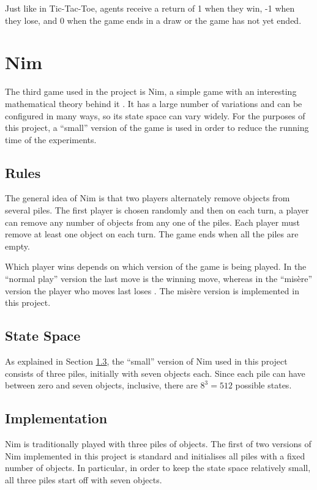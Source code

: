 \documentclass[11pt,a4paper]{report}
\begin{document}
Just like in Tic-Tac-Toe, agents receive a return of 1 when they win, -1 when they lose, and 0 when the game ends in a draw or the game has not yet ended.


\section{Nim}
\label{sec:Nim}

The third game used in the project is Nim, a simple game with an interesting mathematical theory behind it \cite{nim-rules}. It has a large number of variations and can be configured in many ways, so its state space can vary widely. For the purposes of this project, a ``small'' version of the game is used in order to reduce the running time of the experiments.


\subsection{Rules}

The general idea of Nim \cite{nim-rules} is that two players alternately remove objects from several piles. The first player is chosen randomly and then on each turn, a player can remove any number of objects from any one of the piles. Each player must remove at least one object on each turn. The game ends when all the piles are empty.

Which player wins depends on which version of the game is being played. In the ``normal play'' version the last move is the winning move, whereas in the ``mis\`ere'' version the player who moves last loses \cite{winning-ways-math-plays}. The mis\`ere version is implemented in this project.


\subsection{State Space}

As explained in Section \ref{sec:NimImplementation}, the ``small'' version of Nim used in this project  consists of three piles, initially with seven objects each. Since each pile can have between zero and seven objects, inclusive, there are $8^3 = 512$ possible states.


\subsection{Implementation}
\label{sec:NimImplementation}

Nim is traditionally played with three piles of objects. The first of two versions of Nim implemented in this project is standard and initialises all piles with a fixed number of objects. In particular, in order to keep the state space relatively small, all three piles start off with seven objects.
\end{document}

